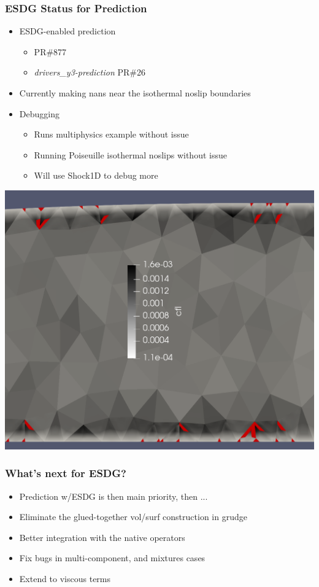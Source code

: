\begin{frame}\frametitle{ESDG Status for Prediction}
\begin{multicols}{2}
\begin{itemize}
\item ESDG-enabled prediction
\begin{itemize}
\item \mirgecom{} PR\#877
\item \textit{drivers\_y3-prediction} PR\#26
\end{itemize}
\item Currently making nans near the isothermal noslip boundaries
\item Debugging
\begin{itemize}
   \item Runs multiphysics example without issue
   \item Running Poiseuille isothermal noslips without issue 
   \item Will use Shock1D to debug more
\end{itemize}
\end{itemize}
\columnbreak
\includegraphics[width=.48\textwidth]{figures/prediction-esdg-nans.png}
\end{multicols}
\end{frame}

\begin{frame}\frametitle{What's next for ESDG?}
\begin{itemize}
\item Prediction w/ESDG is then main priority, then ...
\item Eliminate the glued-together vol/surf construction in grudge
\item Better integration with the native operators
\item Fix bugs in multi-component, and mixtures cases
\item Extend to viscous terms
\end{itemize}
\end{frame}
